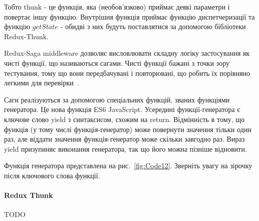Тобто thunk - це функція, яка (необов'язково) приймає деякі параметри і повертає іншу функцію. Внутрішня функція приймає функцію диспетчеризації та функцію $getState$ - обидві з них будуть поставлятися за допомогою бібліотеки Redux-Thunk.

Redux-Saga middleware дозволяє висловлювати складну логіку застосування як чисті функції, що називаються сагами. Чисті функції бажані з точки зору тестування, тому що вони передбачувані і повторювані, що робить їх порівняно легкими для перевірки~\cite{hung2018architectural}.

Саги реалізуються за допомогою спеціальних функцій, званих функціями генератора. Це нова функція ES6 JavaScript. Усередині функції-генератора є ключове слово yield з синтаксисом, схожим на return. Відмінність в тому, що функція (у тому числі функція-генератор) може повернути значення тільки один раз, але віддати значення функція-генератор може скільки завгодно раз. Вираз yield призупиняє виконання генератора, так що його можна пізніше відновити.

Функція генератора представлена на рис.~\ref{fig:Code12}. Зверніть увагу на зірочку після ключового слова функції.


\paragraph{Redux Thunk}

TODO